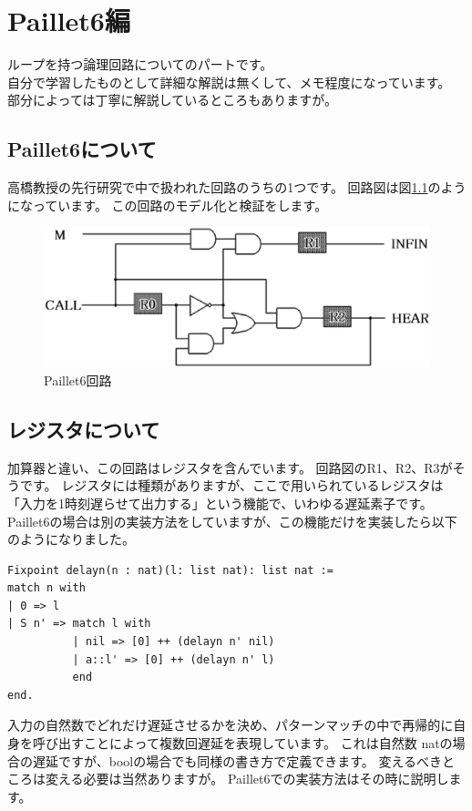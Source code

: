 \documentclass{jsbook}
\begin{document}
\chapter{Paillet6編}
ループを持つ論理回路についてのパートです。\\
自分で学習したものとして詳細な解説は無くして、メモ程度になっています。
部分によっては丁寧に解説しているところもありますが。
\newpage
\section{Paillet6について}
高橋教授の先行研究で中で扱われた回路のうちの1つです。
回路図は図\ref{paillet6}のようになっています。
この回路のモデル化と検証をします。
\begin{figure}[htbp]
\begin{center}
  \includegraphics[width=38zw]{image/Paillet6_AE.eps}
  \caption{Paillet6回路}
  \label{paillet6}
\end{center}
\end{figure}

\section{レジスタについて}
加算器と違い、この回路はレジスタを含んでいます。
回路図のR1、R2、R3がそうです。
レジスタには種類がありますが、ここで用いられているレジスタは「入力を1時刻遅らせて出力する」という機能で、いわゆる遅延素子です。
Paillet6の場合は別の実装方法をしていますが、この機能だけを実装したら以下のようになりました。
\begin{verbatim}
Fixpoint delayn(n : nat)(l: list nat): list nat :=
match n with
| 0 => l
| S n' => match l with
          | nil => [0] ++ (delayn n' nil)
          | a::l' => [0] ++ (delayn n' l)
          end
end.
\end{verbatim}
入力の自然数でどれだけ遅延させるかを決め、パターンマッチの中で再帰的に自身を呼び出すことによって複数回遅延を表現しています。
これは自然数 natの場合の遅延ですが、boolの場合でも同様の書き方で定義できます。
変えるべきところは変える必要は当然ありますが。
Paillet6での実装方法はその時に説明します。
\end{document}
